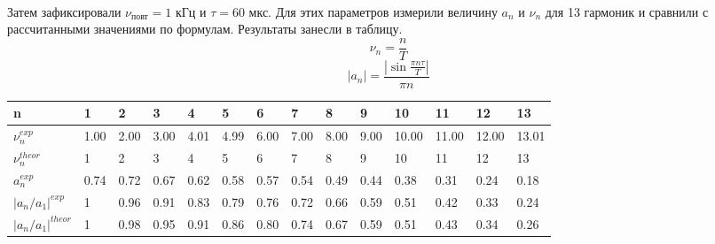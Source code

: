 \documentclass[a4paper,12pt]{article}
\begin{document}
\begin{figure}
    \\
\end{figure}

Затем зафиксировали $\nu_{\text{повт}} = 1$ кГц и $\tau = 60$ мкс. Для этих параметров измерили величину $a_n$ и $\nu_n$ для 13 гармоник и сравнили с рассчитанными значениями по формулам. Результаты занесли в таблицу.
\[\nu_n = \frac{n}{T} \]
\[|a_n| = \frac{|\sin{ \frac{\pi n \tau}{T}}|}{\pi n}\]


\begin{center}
\begin{tabular}{|l|l|l|l|l|l|l|l|l|l|l|l|l|l|}
\hline
n                        & 1    & 2    & 3    & 4    & 5    & 6    & 7    & 8    & 9    & 10    & 11    & 12    & 13    \\ \hline
$\nu_n^{exp}$            & 1.00 & 2.00 & 3.00 & 4.01 & 4.99 & 6.00 & 7.00 & 8.00 & 9.00 & 10.00 & 11.00 & 12.00 & 13.01 \\ \hline
$\nu_n^{theor}$          & 1    & 2    & 3    & 4    & 5    & 6    & 7    & 8    & 9    & 10    & 11    & 12    & 13    \\ \hline
$a_n^{exp}$              & 0.74 & 0.72 & 0.67 & 0.62 & 0.58 & 0.57 & 0.54 & 0.49 & 0.44 & 0.38  & 0.31  & 0.24  & 0.18  \\ \hline
$|a_n / a_1|^{exp}$      & 1    & 0.96 & 0.91 & 0.83 & 0.79 & 0.76 & 0.72 & 0.66 & 0.59 & 0.51  & 0.42  & 0.33  & 0.24  \\ \hline
$|a_n / a_1|^{theor}$    & 1    & 0.98 & 0.95 & 0.91 & 0.86 & 0.80 & 0.74 & 0.67 & 0.59 & 0.51  & 0.43  & 0.34  & 0.26  \\ \hline
\end{tabular}
\end{center}
\end{document}
